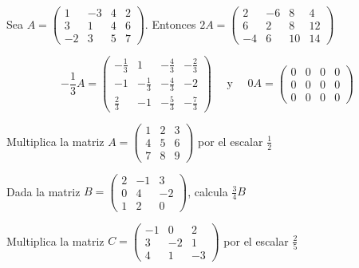 \begin{}
\begin{example}
Sea $A=\left(\begin{array}{rrrr}1 & -3 & 4 & 2 \\ 3 & 1 & 4 & 6 \\ -2 & 3 & 5 & 7\end{array}\right)$. Entonces $2 A=\left(\begin{array}{rrrr}2 & -6 & 8 & 4 \\ 6 & 2 & 8 & 12 \\ -4 & 6 & 10 & 14\end{array}\right)$
\end{example}
\begin{example}
    $$
-\frac{1}{3} A = \left( \begin{array}{rrrr}
-\frac{1}{3} & 1 & -\frac{4}{3} & -\frac{2}{3} \\
-1 & -\frac{1}{3} & -\frac{4}{3} & -2 \\
\frac{2}{3} & -1 & -\frac{5}{3} & -\frac{7}{3} 
\end{array}\right) \quad \text { y } \quad 0 A=\left(\begin{array}{llll}
0 & 0 & 0 & 0 \\
0 & 0 & 0 & 0 \\
0 & 0 & 0 & 0
\end{array}\right)
$$
\end{example}
\begin{exercise}
Multiplica la matriz \( A = \begin{pmatrix} 1 & 2 & 3 \\ 4 & 5 & 6 \\ 7 & 8 & 9 \end{pmatrix} \) por el escalar \( \frac{1}{2} \)
\end{exercise}
\begin{exercise}
 Dada la matriz \( B = \begin{pmatrix} 2 & -1 & 3 \\ 0 & 4 & -2 \\ 1 & 2 & 0 \end{pmatrix} \), calcula \( \frac{3}{4}B \)   
\end{exercise}
\begin{exercise}
 Multiplica la matriz \( C = \begin{pmatrix} -1 & 0 & 2 \\ 3 & -2 & 1 \\ 4 & 1 & -3 \end{pmatrix} \) por el escalar \( \frac{2}{5} \)   
\end{exercise}

\end{}
